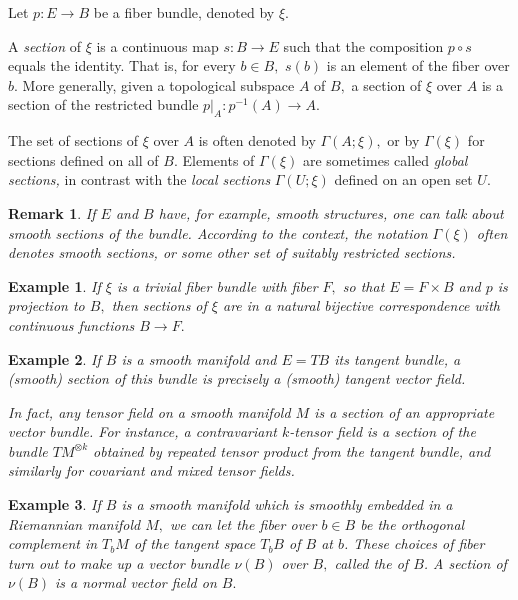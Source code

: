 \documentclass[12pt]{article}
\newcommand{\comp}{\circ} %
\newcommand{\funcsig}[2]{#1\rightarrow #2}
\newcommand{\funcdef}[3]{#1:\funcsig{#2}{#3}}
\newcommand{\inv}[1]{#1^{-1}}
\newtheorem{rmk}{Remark}
\newtheorem{exm}{Example}
\newcommand{\cross}{\times}
\newcommand{\restr}[2]{{#1}|_{#2}}
\begin{document}

Let $\funcdef{p}{E}{B}$ be a fiber bundle, denoted by $\xi.$ 

A {\em section\/} of $\xi$ 
is a continuous map $\funcdef{s}{B}{E}$ such that the composition $p\comp s$ equals the identity. 
That is, for every $b\in B,$ $s(b)$ is an element of the fiber over $b.$
More generally, given a topological subspace $A$ of $B,$ a section of $\xi$ over $A$ is a section of the restricted bundle 
$\funcdef{\restr{p}{A}}{\inv{p}(A)}{A}.$ 

The set of sections of $\xi$ over $A$ is often denoted by $\Gamma(A;\xi),$ or
by $\Gamma(\xi)$ for sections defined on all of $B.$ Elements of $\Gamma(\xi)$ are sometimes
called {\em global sections,\/} in contrast with the {\em local sections\/} $\Gamma(U;\xi)$ defined on an open set $U.$


\begin{rmk}
If $E$ and $B$ have, for example, smooth structures, one can talk about smooth 
sections of the bundle. According to the context, the notation $\Gamma(\xi)$ often
denotes smooth sections, or some other set of suitably restricted sections.
\end{rmk}

\begin{exm}
If $\xi$ is a trivial fiber bundle with fiber $F,$ so that $E=F\cross B$ and
$p$ is projection to $B,$ then sections of $\xi$ are in a natural bijective correspondence with continuous functions $\funcsig{B}{F}.$
\end{exm}


\begin{exm}
If $B$ is a smooth manifold and $E=TB$ its tangent bundle, a (smooth) section of this bundle is precisely a (smooth) tangent vector field. 

In fact, any tensor field on a smooth manifold $M$ is a section of
an appropriate vector bundle. For instance, a contravariant $k$-tensor field is a section of the bundle $TM^{\otimes k}$ obtained by repeated  tensor product from the tangent bundle, and similarly for covariant and mixed tensor fields.
\end{exm}

\begin{exm}
If $B$ is a smooth manifold which is smoothly embedded in a Riemannian manifold 
$M,$ we can let the fiber over $b\in B$ be the orthogonal complement in $T_b M$ of the tangent space $T_b B$ of $B$ at $b$. These choices of fiber turn out to 
make up a vector bundle $\nu(B)$ over $B,$ called the {\em 
{}\/} of $B$. A section of $\nu(B)$ is a normal 
vector field on $B.$
\end{exm}
\end{document}
